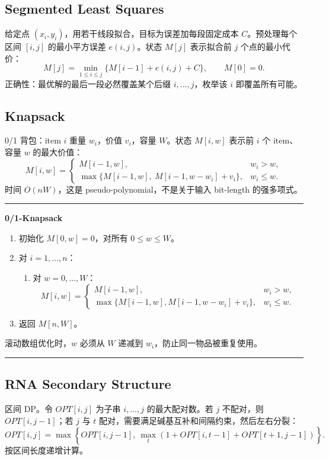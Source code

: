 \documentclass[UTF8,a4paper,11pt]{ctexart}
\newenvironment{algobox}[1]
{\par\medskip\noindent\begin{minipage}{0.96\linewidth}\hrule\vspace{0.35em}\textbf{#1}\par\vspace{0.25em}\small}
{\par\vspace{0.25em}\hrule\end{minipage}\par\medskip}
\begin{document}
\subsection{Segmented Least Squares}

给定点 $(x_i,y_i)$，用若干线段拟合，目标为误差加每段固定成本 $C$。预处理每个区间 $[i,j]$ 的最小平方误差 $e(i,j)$。状态 $M[j]$ 表示拟合前 $j$ 个点的最小代价：
\[
M[j]=\min_{1\le i\le j}\{M[i-1]+e(i,j)+C\},\qquad M[0]=0.
\]
正确性：最优解的最后一段必然覆盖某个后缀 $i,\ldots,j$，枚举该 $i$ 即覆盖所有可能。

\subsection{Knapsack}

0/1 背包：item $i$ 重量 $w_i$，价值 $v_i$，容量 $W$。状态 $M[i,w]$ 表示前 $i$ 个 item、容量 $w$ 的最大价值：
\[
M[i,w]=
\begin{cases}
M[i-1,w], & w_i>w,\\
\max\{M[i-1,w],\ M[i-1,w-w_i]+v_i\}, & w_i\le w.
\end{cases}
\]
时间 $O(nW)$，这是 pseudo-polynomial，不是关于输入 bit-length 的强多项式。

\begin{algobox}{0/1-Knapsack}
\begin{enumerate}
  \item 初始化 $M[0,w]=0$，对所有 $0\le w\le W$。
  \item 对 $i=1,\ldots,n$：
  \begin{enumerate}
    \item 对 $w=0,\ldots,W$：
    \[
    M[i,w]=
    \begin{cases}
    M[i-1,w], & w_i>w,\\
    \max\{M[i-1,w],M[i-1,w-w_i]+v_i\}, & w_i\le w.
    \end{cases}
    \]
  \end{enumerate}
  \item 返回 $M[n,W]$。
\end{enumerate}
滚动数组优化时，$w$ 必须从 $W$ 递减到 $w_i$，防止同一物品被重复使用。
\end{algobox}

\subsection{RNA Secondary Structure}

区间 DP。令 $OPT[i,j]$ 为子串 $i,\ldots,j$ 的最大配对数。若 $j$ 不配对，则 $OPT[i,j-1]$；若 $j$ 与 $t$ 配对，需要满足碱基互补和间隔约束，然后左右分裂：
\[
OPT[i,j]=\max\left\{OPT[i,j-1],\ \max_t\left(1+OPT[i,t-1]+OPT[t+1,j-1]\right)\right\}.
\]
按区间长度递增计算。
\end{document}
